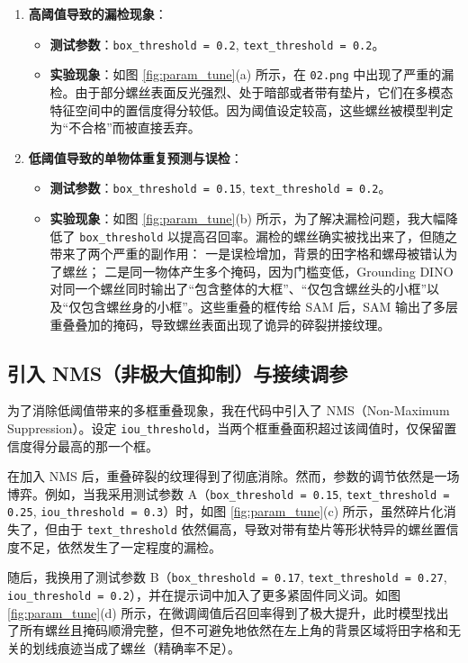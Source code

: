 \documentclass[12pt,a4paper]{ctexart}
\begin{document}
\begin{enumerate}
    \item \textbf{高阈值导致的漏检现象}：
    \begin{itemize}
        \item \textbf{测试参数}：\texttt{box\_threshold = 0.2}, \texttt{text\_threshold = 0.2}。
        \item \textbf{实验现象}：如图 \ref{fig:param_tune}(a) 所示，在 \texttt{02.png} 中出现了严重的漏检。由于部分螺丝表面反光强烈、处于暗部或者带有垫片，它们在多模态特征空间中的置信度得分较低。因为阈值设定较高，这些螺丝被模型判定为“不合格”而被直接丢弃。
    \end{itemize}
    
    \item \textbf{低阈值导致的单物体重复预测与误检}：
    \begin{itemize}
        \item \textbf{测试参数}：\texttt{box\_threshold = 0.15}, \texttt{text\_threshold = 0.2}。
        \item \textbf{实验现象}：如图 \ref{fig:param_tune}(b) 所示，为了解决漏检问题，我大幅降低了 \texttt{box\_threshold} 以提高召回率。漏检的螺丝确实被找出来了，但随之带来了两个严重的副作用：
        一是误检增加，背景的田字格和螺母被错认为了螺丝；
        二是同一物体产生多个掩码，因为门槛变低，Grounding DINO 对同一个螺丝同时输出了“包含整体的大框”、“仅包含螺丝头的小框”以及“仅包含螺丝身的小框”。这些重叠的框传给 SAM 后，SAM 输出了多层重叠叠加的掩码，导致螺丝表面出现了诡异的碎裂拼接纹理。
    \end{itemize}
\end{enumerate}

\subsection{引入 NMS（非极大值抑制）与接续调参}

为了消除低阈值带来的多框重叠现象，我在代码中引入了 NMS（Non-Maximum Suppression）。设定 \texttt{iou\_threshold}，当两个框重叠面积超过该阈值时，仅保留置信度得分最高的那一个框。

在加入 NMS 后，重叠碎裂的纹理得到了彻底消除。然而，参数的调节依然是一场博弈。例如，当我采用测试参数 A（\texttt{box\_threshold = 0.15}, \texttt{text\_threshold = 0.25}, \texttt{iou\_threshold = 0.3}）时，如图 \ref{fig:param_tune}(c) 所示，虽然碎片化消失了，但由于 \texttt{text\_threshold} 依然偏高，导致对带有垫片等形状特异的螺丝置信度不足，依然发生了一定程度的漏检。

随后，我换用了测试参数 B（\texttt{box\_threshold = 0.17}, \texttt{text\_threshold = 0.27}, \texttt{iou\_threshold = 0.2}），并在提示词中加入了更多紧固件同义词。如图 \ref{fig:param_tune}(d) 所示，在微调阈值后召回率得到了极大提升，此时模型找出了所有螺丝且掩码顺滑完整，但不可避免地依然在左上角的背景区域将田字格和无关的划线痕迹当成了螺丝（精确率不足）。
\end{document}
